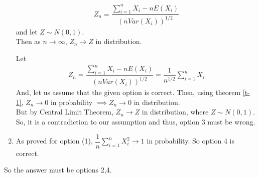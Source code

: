 \documentclass[journal,12pt,twocolumn]{IEEEtran}
\begin{document}
\begin{enumerate}
\begin{theorem}
\begin{align}
            Z_n=\dfrac{\sum_{i=1}^nX_i-nE(X_i)}{(nVar(X_i))^{1/2}}
        \end{align}
         and let $Z \sim N(0,1)$.\\
         Then as $n \to \infty$, $Z_n \to Z$ in distribution.
        \end{theorem}
        Let
        \begin{align}
            Z_n=\dfrac{\sum_{i=1}^nX_i-nE(X_i)}{(nVar(X_i))^{1/2}}=\dfrac{1}{n^{1/2}}\sum_{i=1}^nX_i
        \end{align}
        And, let us assume that the given option is correct.
        Then, using theorem \ref{t-1}, $Z_n \to 0$ in probability $\implies Z_n \to 0$ in distribution.\\
        But by Central Limit Theorem, $Z_n \to Z$ in distribution, where $Z \sim N(0,1)$.
        So, it is a contradiction to our assumption and thus, option 3 must be wrong. 
    \item
        As proved for option (1), $\dfrac{1}{n}\sum_{i=1}^nX_i^2 \to 1$ in probability.
        So option 4 is correct.
\end{enumerate}
So the answer must be options 2,4.
\end{document}
